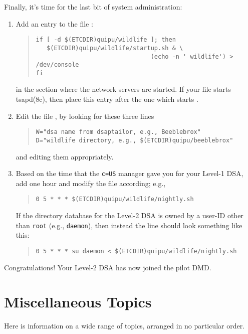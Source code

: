 Finally,
it's time for the last bit of system administration:
\begin{enumerate}
\item	Add an entry to the file :
\begin{quote}\smaller\begin{verbatim}
if [ -d $(ETCDIR)quipu/wildlife ]; then
   $(ETCDIR)quipu/wildlife/startup.sh & \
                                (echo -n ' wildlife') > /dev/console
fi
\end{verbatim}\end{quote}
in the section where the network servers are started.
If your  file starts \man tsapd(8c),
then place this entry after the one which starts .

\item	Edit the file ,
by looking for these three lines
\begin{quote}\smaller\begin{verbatim}
W="dsa name from dsaptailor, e.g., Beeblebrox"
D="wildlife directory, e.g., $(ETCDIR)quipu/beeblebrox"
\end{verbatim}\end{quote}
and editing them appropriately.

\item	Based on the time that the \verb"c=US" manager gave you for your
Level-1 DSA, add one hour and modify the \file{crontab} file according; e.g.,
\begin{quote}\small\begin{verbatim}
0 5 * * * $(ETCDIR)quipu/wildlife/nightly.sh
\end{verbatim}\end{quote}
If the directory database for the Level-2 DSA is owned by a user-ID other
than \verb"root" (e.g., \verb"daemon"),
then instead the line should look something like this:
\begin{quote}\small\begin{verbatim}
0 5 * * * su daemon < $(ETCDIR)quipu/wildlife/nightly.sh
\end{verbatim}\end{quote}
\end{enumerate}

Congratulations!
Your Level-2 DSA has now joined the pilot DMD.

\section	{Miscellaneous Topics}
Here is information on a wide range of topics,
arranged in  no particular order.

